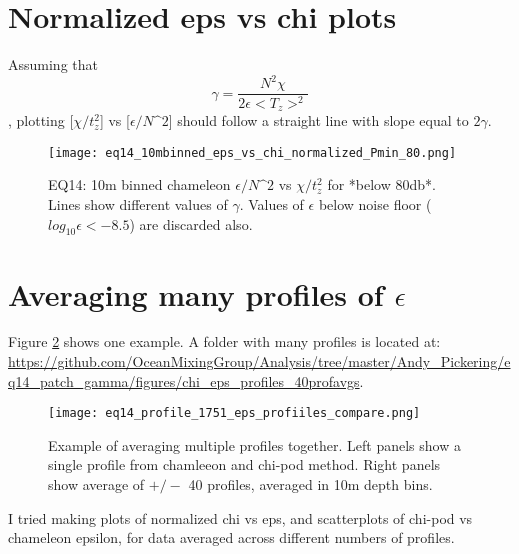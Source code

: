 \documentclass[11pt]{article}
\begin{document}
\clearpage
\section{Normalized eps vs chi plots}

Assuming that
\begin{equation}
\gamma=\frac{N^2 \chi}{2\epsilon<T_z>^2}
\end{equation}
, plotting [$\chi/t_{z}^{2}$] vs [$\epsilon/N\^2$] should follow a straight line with slope equal to $2\gamma$.


\begin{figure}[htbp]
\texttt{[image: eq14\_10mbinned\_eps\_vs\_chi\_normalized\_Pmin\_80.png]}
\caption{EQ14: 10m binned  chameleon $\epsilon/N\^2$ vs $\chi/t_{z}^{2}$ for *below 80db*. Lines show different values of $\gamma$. Values of $\epsilon$ below noise floor ($log_{10}\epsilon<-8.5$) are discarded also.}
\label{}
\end{figure}





\clearpage
\section{Averaging many profiles of $\epsilon$}

Figure \ref{prof_avg_ex} shows one example. A folder with many profiles is located at:
\url{https://github.com/OceanMixingGroup/Analysis/tree/master/Andy_Pickering/eq14_patch_gamma/figures/chi_eps_profiles_40profavgs}. %

\begin{figure}[htbp]
\texttt{[image: eq14\_profile\_1751\_eps\_profiiles\_compare.png]}
\caption{Example of averaging multiple profiles together. Left panels show a single profile from chamleeon and chi-pod method. Right panels show average of $+/-$ 40 profiles, averaged in 10m depth bins.}
\label{prof_avg_ex}
\end{figure}



I tried making plots of normalized chi vs eps, and scatterplots of chi-pod vs chameleon epsilon, for data averaged across different numbers of profiles. 
\end{document}
